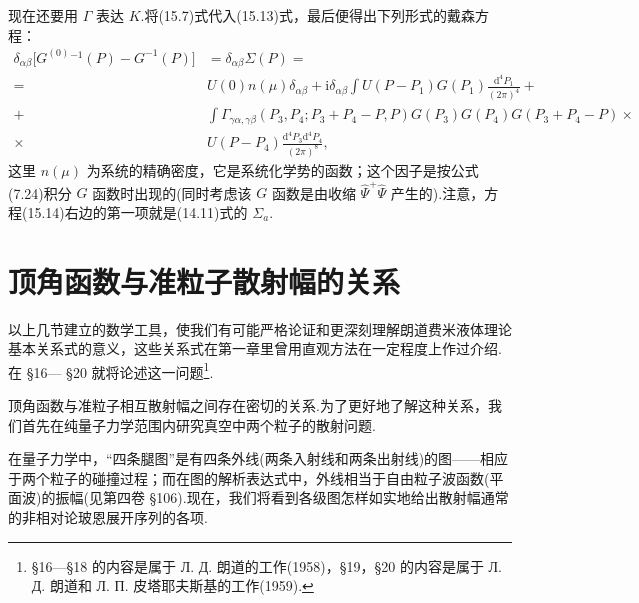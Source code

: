 现在还要用 $\Gamma$ 表达 $K$.将(15.7)式代入(15.13)式，最后便得出下列形式的戴森方程：
\begin{equation}
\begin{aligned}
  \delta_{\alpha\beta}\bigl[G^{(0)}{}^{-1}(P)-G^{-1}(P)\bigr]&=\delta_{\alpha\beta}\Sigma(P)=\\
  ={}&U(0)n(\mu)\delta_{\alpha\beta}+\mathrm{i}\delta_{\alpha\beta}\int U(P-P_1)G(P_1)\frac{\mathrm{d}^4P_1}{(2\pi)^4}+\\
  +{}&\int\Gamma_{\gamma\alpha,\gamma\beta}(P_3,P_4;P_3+P_4-P,P)G(P_3)G(P_4)G(P_3+P_4-P)\times\\
  \times{}&U(P-P_4)\frac{\mathrm{d}^4P_3\mathrm{d}^4P_4}{(2\pi)^8},
\end{aligned}
\end{equation}
这里 $n(\mu)$ 为系统的精确密度，它是系统化学势的函数；这个因子是按公式(7.24)积分 $G$ 函数时出现的(同时考虑该 $G$ 函数是由收缩 $\hat{\Psi}^{+}\hat{\Psi}$ 产生的).注意，方程(15.14)右边的第一项就是(14.11)式的 $\Sigma_a$.

\section{顶角函数与准粒子散射幅的关系}

以上几节建立的数学工具，使我们有可能严格论证和更深刻理解朗道费米液体理论基本关系式的意义，这些关系式在第一章里曾用直观方法在一定程度上作过介绍.在 §16— §20 就将论述这一问题\footnote{§16—§18 的内容是属于 Л. Д. 朗道的工作(1958)，§19，§20 的内容是属于 Л. Д. 朗道和 Л. П. 皮塔耶夫斯基的工作(1959).}.

顶角函数与准粒子相互散射幅之间存在密切的关系.为了更好地了解这种关系，我们首先在纯量子力学范围内研究真空中两个粒子的散射问题.

在量子力学中，“四条腿图”是有四条外线(两条入射线和两条出射线)的图——相应于两个粒子的碰撞过程；而在图的解析表达式中，外线相当于自由粒子波函数(平面波)的振幅(见第四卷 §106).现在，我们将看到各级图怎样如实地给出散射幅通常的非相对论玻恩展开序列的各项.

